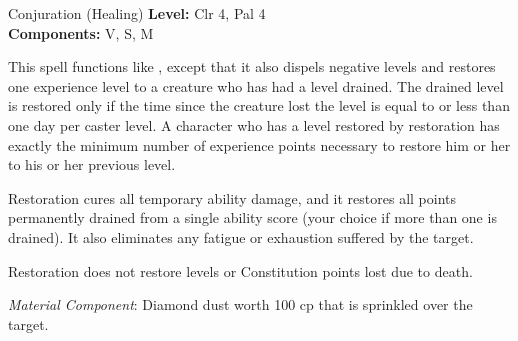 {Conjuration (Healing)}
{
	\textbf{Level:}
	Clr 4, Pal 4\\
	\textbf{Components:}
	V, S, M\\
}
{
	This spell functions like , except that it also dispels negative levels and restores one experience level to a creature who has had a level drained. The drained level is restored only if the time since the creature lost the level is equal to or less than one day per caster level. A character who has a level restored by restoration has exactly the minimum number of experience points necessary to restore him or her to his or her previous level.

	Restoration cures all temporary ability damage, and it restores all points permanently drained from a single ability score (your choice if more than one is drained). It also eliminates any fatigue or exhaustion suffered by the target.

	Restoration does not restore levels or Constitution points lost due to death.

	\textit{Material Component}:
	Diamond dust worth 100 cp that is sprinkled over the target.

}
